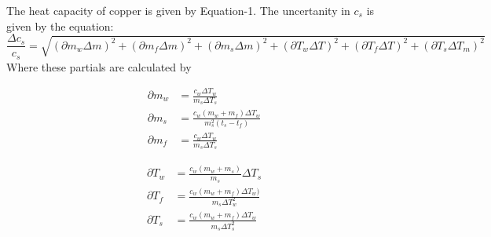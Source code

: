 \documentclass[%
 sor,
 jor,
 amsmath,amssymb,
 reprint,%
]{revtex4-2}
\begin{document}
The heat capacity of copper is given by Equation-1. The uncertanity in $c_s$ is given by the equation:
$$
   \frac {\Delta c_s} {c_s} =\sqrt{ 
(\partial m_w \Delta m)^2 + (\partial m_f \Delta m)^2 + (\partial m_s \Delta m)^2 + (\partial T_w \Delta T)^2 + (\partial T_f \Delta T)^2 + (\partial T_s \Delta T_m)^2 
}$$
Where these partials are calculated by\\
\begin{minipage}{0.5\textwidth}
\begin{align*}
  {\partial m_w} &= \frac{c_w \Delta T_w}{m_s \Delta T_s} \\
  {\partial m_s} &= \frac{c_w(m_w +m_f)\Delta T_w}{m_s^2 (t_s - t_f)} \\
    {\partial m_f} &= \frac{c_w \Delta T_w}{m_s \Delta T_s}
\end{align*}
\end{minipage}%
\begin{minipage}{0.5\textwidth}
\begin{align*}
{\partial T_w} &= \frac{c_w(m_w + m_s) }{m_s} {\Delta T_s} \\
   {\partial T_f} &= \frac{c_w(m_w + m_f) \Delta T_w)}{m_s \Delta T_w^2} \\
    {\partial T_s} &= \frac{c_w(m_w +m_f)\Delta T_w}{m_s \Delta T_s^2}
\end{align*}
\end{minipage}
\end{document}
